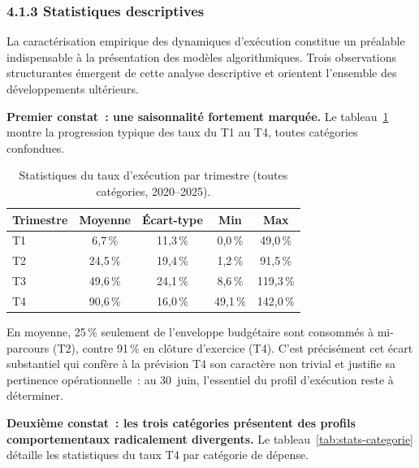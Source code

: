 \subsubsection*{4.1.3 \quad Statistiques descriptives}

La caract\'erisation empirique des dynamiques d'ex\'ecution constitue un pr\'ealable
indispensable \`a la pr\'esentation des mod\`eles algorithmiques. Trois observations
structurantes \'emergent de cette analyse descriptive et orientent l'ensemble des
d\'eveloppements ult\'erieurs.

\textbf{Premier constat~: une saisonnalit\'e fortement marqu\'ee.} Le tableau~\ref{tab:stats-trimestre}
montre la progression typique des taux du T1 au T4, toutes cat\'egories confondues.

\begin{table}[H]
\centering\small
\caption{Statistiques du taux d'ex\'ecution par trimestre (toutes cat\'egories, 2020--2025).}
\label{tab:stats-trimestre}
\begin{tabular}{@{}lcccc@{}}
\toprule
\textbf{Trimestre} & \textbf{Moyenne} & \textbf{\'Ecart-type} & \textbf{Min} & \textbf{Max} \\
\midrule
T1 &  6{,}7\,\% & 11{,}3\,\% &  0{,}0\,\% &  49{,}0\,\% \\
T2 & 24{,}5\,\% & 19{,}4\,\% &  1{,}2\,\% &  91{,}5\,\% \\
T3 & 49{,}6\,\% & 24{,}1\,\% &  8{,}6\,\% & 119{,}3\,\% \\
T4 & 90{,}6\,\% & 16{,}0\,\% & 49{,}1\,\% & 142{,}0\,\% \\
\bottomrule
\end{tabular}
\end{table}

\noindent
En moyenne, 25\,\% seulement de l'enveloppe budg\'etaire sont consomm\'es \`a mi-parcours
(T2), contre 91\,\% en cl\^oture d'exercice (T4). C'est pr\'ecis\'ement cet \'ecart
substantiel qui conf\`ere \`a la pr\'evision T4 son caract\`ere non trivial et justifie
sa pertinence op\'erationnelle~: au 30~juin, l'essentiel du profil d'ex\'ecution reste
\`a d\'eterminer.

\textbf{Deuxi\`eme constat~: les trois cat\'egories pr\'esentent des profils
comportementaux radicalement divergents.} Le tableau~\ref{tab:stats-categorie} d\'etaille les statistiques du
taux T4 par cat\'egorie de d\'epense.


